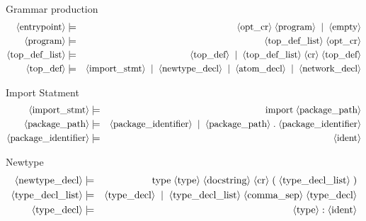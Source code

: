 \newcommand{\pn}[1]{\langle \textnormal{#1} \rangle}
\newcommand{\pp}{\models}
\newcommand{\oo}{\; \mid \;}
\newcommand{\sk}{\dots }
\newcommand{\ww}{\;}
\newcommand{\nn}{\perp}
\newcommand{\sm}[1]{\textnormal{#1}}
\newcommand{\sd}[1]{\textnormal{\it #1}}


Grammar production
\begin{eqnarray*}
  \pn{entrypoint} &\pp&
    \pn{opt{\textunderscore}cr} \ww \pn{program} \oo
    \pn{empty} \\
  \pn{program} &\pp&
    \pn{top{\textunderscore}def{\textunderscore}list} \ww
    \pn{opt{\textunderscore}cr} \\
  \pn{top{\textunderscore}def{\textunderscore}list} &\pp&
    \pn{top{\textunderscore}def} \oo
    \pn{top{\textunderscore}def{\textunderscore}list} \ww
    \pn{cr} \ww
    \pn{top{\textunderscore}def} \\
  \pn{top{\textunderscore}def} &\pp&
    \pn{import{\textunderscore}stmt} \oo
    \pn{newtype{\textunderscore}decl} \oo
    \pn{atom{\textunderscore}decl} \oo
    \pn{network{\textunderscore}decl} \\
\end{eqnarray*}

Import Statment
\begin{eqnarray*}
  \pn{import{\textunderscore}stmt} &\pp&
    \sm{import} \ww
    \pn{package{\textunderscore}path} \\
  \pn{package{\textunderscore}path} &\pp& 
    \pn{package{\textunderscore}identifier} \oo
    \pn{package{\textunderscore}path} \ww
    \sm{.} \ww
    \pn{package{\textunderscore}identifier} \\
  \pn{package{\textunderscore}identifier} &\pp& \pn{ident} \\
\end{eqnarray*}

Newtype
\begin{eqnarray*}
  \pn{newtype{\textunderscore}decl} &\pp&
    \sm{type} \ww
    \pn{type} \ww
    \pn{docstring} \ww
    \pn{cr} \ww
    \sm{(} \ww
    \pn{type{\textunderscore}decl{\textunderscore}list} \ww
    \sm{)} \\
  \pn{type{\textunderscore}decl{\textunderscore}list} &\pp&
    \pn{type{\textunderscore}decl} \oo
    \pn{type{\textunderscore}decl{\textunderscore}list} \ww
    \pn{comma{\textunderscore}sep} \ww
    \pn{type{\textunderscore}decl} \\
  \pn{type{\textunderscore}decl} &\pp&
    \pn{type} \ww
    \sm{:} \ww
    \pn{ident} \\
\end{eqnarray*}

